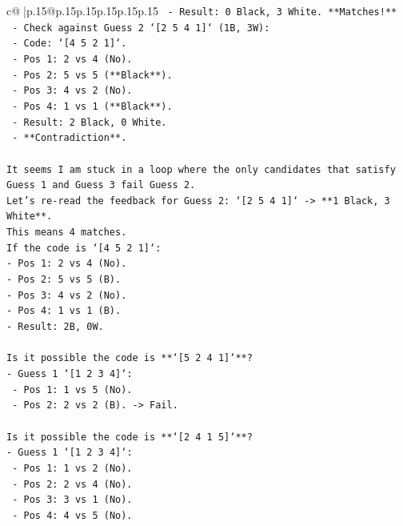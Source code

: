 \documentclass{article}
\begin{document}
{\begin{supertabular}{c@{$\;$}|p{.15\linewidth}@{}p{.15\linewidth}p{.15\linewidth}p{.15\linewidth}p{.15\linewidth}p{.15\linewidth}}
{{{\texttt{         {-} Result: 0 Black, 3 White. **Matches!**} \\
\texttt{       {-} Check against Guess 2 `{[}2 5 4 1{]}` (1B, 3W):} \\
\texttt{         {-} Code: `{[}4 5 2 1{]}`.} \\
\texttt{         {-} Pos 1: 2 vs 4 (No).} \\
\texttt{         {-} Pos 2: 5 vs 5 (**Black**).} \\
\texttt{         {-} Pos 3: 4 vs 2 (No).} \\
\texttt{         {-} Pos 4: 1 vs 1 (**Black**).} \\
\texttt{         {-} Result: 2 Black, 0 White.} \\
\texttt{         {-} **Contradiction**.} \\
\\ 
\texttt{It seems I am stuck in a loop where the only candidates that satisfy Guess 1 and Guess 3 fail Guess 2.} \\
\texttt{Let's re{-}read the feedback for Guess 2: `{[}2 5 4 1{]}` {-}> **1 Black, 3 White**.} \\
\texttt{This means 4 matches.} \\
\texttt{If the code is `{[}4 5 2 1{]}`:} \\
\texttt{{-} Pos 1: 2 vs 4 (No).} \\
\texttt{{-} Pos 2: 5 vs 5 (B).} \\
\texttt{{-} Pos 3: 4 vs 2 (No).} \\
\texttt{{-} Pos 4: 1 vs 1 (B).} \\
\texttt{{-} Result: 2B, 0W.} \\
\\ 
\texttt{Is it possible the code is **`{[}5 2 4 1{]}`**?} \\
\texttt{{-} Guess 1 `{[}1 2 3 4{]}`:} \\
\texttt{    {-} Pos 1: 1 vs 5 (No).} \\
\texttt{    {-} Pos 2: 2 vs 2 (B). {-}> Fail.} \\
\\ 
\texttt{Is it possible the code is **`{[}2 4 1 5{]}`**?} \\
\texttt{{-} Guess 1 `{[}1 2 3 4{]}`:} \\
\texttt{    {-} Pos 1: 1 vs 2 (No).} \\
\texttt{    {-} Pos 2: 2 vs 4 (No).} \\
\texttt{    {-} Pos 3: 3 vs 1 (No).} \\
\texttt{    {-} Pos 4: 4 vs 5 (No).} \\
}}}
\end{supertabular}}
\end{document}
